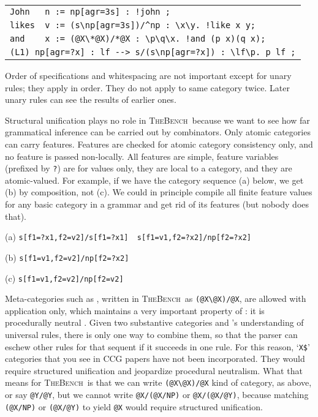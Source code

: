 \documentclass[11pt]{article}
\newcommand{\tool}{\textsc{TheBench}}
\begin{document}
\begin{tabular}{l}
\verb|John   n := np[agr=3s] : !john ;|\\ 
\verb|likes  v := (s\np[agr=3s])/^np : \x\y. !like x y;|\\
\verb|and    x := (@X\*@X)/*@X : \p\q\x. !and (p x)(q x);|\\
\verb|(L1) np[agr=?x] : lf --> s/(s\np[agr=?x]) : \lf\p. p lf ;|
\end{tabular}\medskip

\noindent Order of specifications and whitespacing are not important {except for unary rules; they apply in order. They do
not apply to same category twice}.  {Later unary rules can see the results of earlier ones.}

Structural unification plays no role in \tool\, because we want to see how far grammatical inference can be carried out by combinators. 
Only atomic categories can carry features.
Features are checked for
atomic category consistency only, and no feature is passed non-locally. All features are simple, feature variables (prefixed by \verb+?+) are
for values only, they are local to a category, and they are atomic-valued. For example, if we have the category sequence (a) below, we get
(b) by composition, not (c). We could in principle compile all finite feature values for any basic category in a grammar and get rid of its features (but nobody does that). 

(a) \verb|s[f1=?x1,f2=v2]/s[f1=?x1]  s[f1=v1,f2=?x2]/np[f2=?x2]|

(b) \verb|s[f1=v1,f2=v2]/np[f2=?x2]|

(c) \verb|s[f1=v1,f2=v2]/np[f2=v2]| 

 
\noindent Meta-categories such as , written in \tool\, as \verb+(@X\@X)/@X+, are allowed with application only,
which maintains a very important property of : it is procedurally neutral \citep{pareschisteedman87}. Given two substantive categories and 's understanding of universal rules, there is only one way to combine them,
so that the parser can eschew other rules for that sequent if it succeeds in one rule. For this reason, `\verb|X$|' categories that you see in CCG papers
have not been incorporated. They would require structured unification and jeopardize procedural neutralism. What that means for \tool\, is that
we can write \verb+(@X\@X)/@X+ kind of category, as above, or say \verb+@Y/@Y+, but we cannot write \verb+@X/(@X/NP)+ or \verb+@X/(@X/@Y)+, because
matching \verb+(@X/NP)+ or \verb+(@X/@Y)+ to yield \verb+@X+ would require structured unification.
\end{document}
